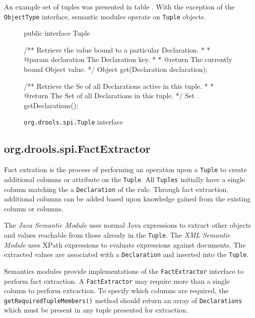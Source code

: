 An example set of tuples was presented in table
. With the exception of the \verb|ObjectType|
interface, semantic modules operate on \verb|Tuple| objects. 

\begin{figure}
\begin{codelisting}
public interface Tuple
{
    /** Retrieve the value bound to a particular Declaration.
     *
     *  @param declaration The Declaration key.
     *
     *  @return The currently bound Object value.
     */
    Object get(Declaration declaration);

    /** Retrieve the Se of all Declarations active in this tuple.
     *
     *  @return The Set of all Declarations in this tuple.
     */
    Set getDeclarations();
}
\end{codelisting}
\label{code.Tuple}
\caption{\texttt{org.drools.spi.Tuple} interface}
\end{figure}

\subsection{org.drools.spi.FactExtractor}

Fact extration is the process of performing an operation upon a
\verb|Tuple| to create additional columns or attribute on the
\verb|Tuple|.  All \verb|Tuples| initially have a single column
matching the a \verb|Declaration| of the rule.  Through fact
extraction, additional columns can be added based upon knowledge
gained from the existing column or columns.

The \emph{Java Semantic Module} uses normal Java expressions to
extract other objects and values reachable from those already in the
\verb|Tuple|.  The \emph{XML Semantic Module} uses XPath expressions
to evaluate expressions against documents.  The extracted values are
associated with a \verb|Declaration| and inserted into the
\verb|Tuple|.

Semantics modules provide implementations of the \verb|FactExtractor|
interface to perform fact extraction. A \verb|FactExtractor| may
require more than a single column to perform extraction.  To specify
which columns are required, the \verb|getRequiredTupleMembers()| 
method should return an array of \verb|Declarations| which must 
be present in any tuple presented for extraction.

